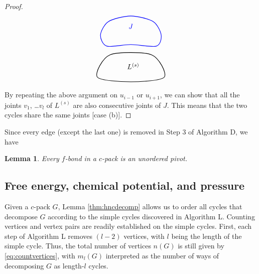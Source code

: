 \documentclass[aip,jcp,reprint,superscriptaddress]{revtex4-1}
\newtheorem{lemm}[thrm]{Lemma}
\begin{document}
\begin{proof}
\[\begin{tikzpicture}
    \draw[draw=black, thick]
      plot [smooth cycle]
      coordinates{ ( 0.8*\sz, 0.6*\sz)
                   ( 2.4*\sz, 3.4*\sz)
                   ( 7.6*\sz, 3.4*\sz)
                   ( 9.2*\sz, 0.6*\sz)
                   ( 5.0*\sz, 0.0*\sz) };

    \node (L) at (5.3*\sz, 2.0*\sz) {$L^{(s)}$};

    \draw[thick, draw=blue]
      plot [smooth cycle]
      coordinates{
                   ( 2.0*\sz, 4.5*\sz)
                   ( 1.2*\sz, 5.9*\sz)
                   ( 2.2*\sz, 7.6*\sz)
                   ( 5.0*\sz, 8.3*\sz)
                   ( 7.8*\sz, 7.6*\sz)
                   ( 8.8*\sz, 5.9*\sz)
                   ( 8.2*\sz, 4.5*\sz)
                   ( 5.0*\sz, 4.7*\sz) };

    \node (J) at (5.0*\sz, 7.0*\sz) [blue] {$J$};
  \end{tikzpicture}
\]

By repeating the above argument on $u_{i-1}$ or $u_{i+1}$,
we can show that
  all the joints $v_1$, \dots $v_l$ of $L^{(s)}$
  are also consecutive joints of $J$.
%
This means that the two cycles share the same joints
  [case (b)].
\end{proof}



Since every edge (except the last one) is removed in Step 3 of Algorithm D,
we have
\begin{lemm}
  Every $f$-bond in a $c$-pack is an unordered pivot.
\label{thm:hncfpivot}
\end{lemm}




\subsection{\label{sec:hncFexmuex}Free energy, chemical potential, and pressure}


Given a $c$-pack $G$,
  Lemma \ref{thm:hncdecomp} allows us
  to order all cycles that decompose $G$
  according to the simple cycles
  discovered in Algorithm L.
%
Counting vertices and vertex pairs
  are readily established on the simple cycles.
%
First, each step of Algorithm L removes $(l - 2)$ vertices,
  with $l$ being the length of the simple cycle.
%
Thus, the total number of vertices $n(G)$
  is still given by \eqref{eq:countvertices},
  with $m_l(G)$ interpreted as
  the number of ways
  of decomposing $G$ as length-$l$ cycles.
\end{document}
